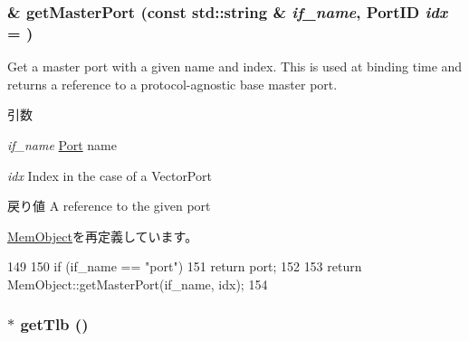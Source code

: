 \hypertarget{classArmISA_1_1TableWalker_adc4e675e51defbdd1e354dac729d0703}{
\subsubsection[{getMasterPort}]{ \& getMasterPort (const std::string \& {\em if\_\-name}, \/  {\bf PortID} {\em idx} = {})}}
\label{classArmISA_1_1TableWalker_adc4e675e51defbdd1e354dac729d0703}
Get a master port with a given name and index. This is used at binding time and returns a reference to a protocol-\/agnostic base master port.


\begin{DoxyParams}{引数}
\item[{\em if\_\-name}]\hyperlink{classPort}{Port} name \item[{\em idx}]Index in the case of a VectorPort\end{DoxyParams}
\begin{DoxyReturn}{戻り値}
A reference to the given port 
\end{DoxyReturn}


\hyperlink{classMemObject_adc4e675e51defbdd1e354dac729d0703}{MemObject}を再定義しています。


\begin{DoxyCode}
149 {
150     if (if_name == "port") {
151         return port;
152     }
153     return MemObject::getMasterPort(if_name, idx);
154 }
\end{DoxyCode}
\hypertarget{classArmISA_1_1TableWalker_a93d3a5cc8edcf04b6e62ce3ce3eb215c}{
\subsubsection[{getTlb}]{$\ast$ getTlb ()}}
\label{classArmISA_1_1TableWalker_a93d3a5cc8edcf04b6e62ce3ce3eb215c}



